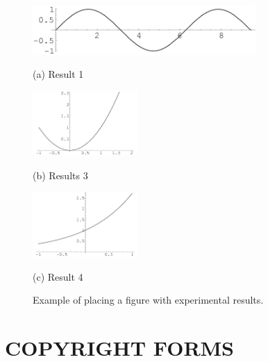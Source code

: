 \documentclass{article}
\begin{document}
\begin{figure}[htb]

\begin{minipage}[b]{1.0\linewidth}
  \centering
  \centerline{\includegraphics[width=8.5cm]{image1.png}}
  \centerline{(a) Result 1}\medskip
\end{minipage}
%
\begin{minipage}[b]{.48\linewidth}
  \centering
  \centerline{\includegraphics[width=4.0cm]{image3.png}}
  \centerline{(b) Results 3}\medskip
\end{minipage}
\hfill
\begin{minipage}[b]{0.48\linewidth}
  \centering
  \centerline{\includegraphics[width=4.0cm]{image4.png}}
  \centerline{(c) Result 4}\medskip
\end{minipage}
%
\caption{Example of placing a figure with experimental results.}
\label{fig:res}
%
\end{figure}



\section{COPYRIGHT FORMS}
\label{sec:copyright}
\end{document}
